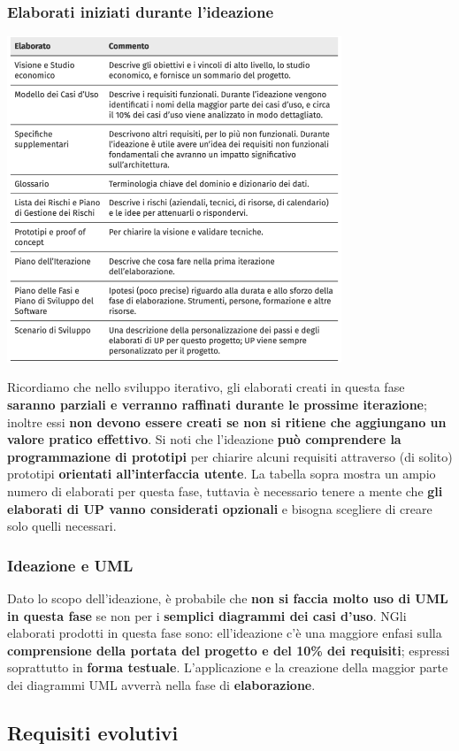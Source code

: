\documentclass[12pt]{article}
\begin{document}
\subsubsection{Elaborati iniziati durante l'ideazione}
\begin{center}
    \includegraphics[width = 0.75\textwidth]{Images/26.png}
\end{center}
Ricordiamo che nello sviluppo iterativo, gli elaborati creati in questa fase \textbf{saranno parziali e verranno raffinati durante le prossime iterazione}; inoltre essi \textbf{non devono essere creati se non si ritiene che aggiungano un valore pratico effettivo}.
Si noti che l'ideazione \textbf{può comprendere la programmazione di prototipi} per chiarire alcuni requisiti attraverso (di solito) prototipi \textbf{orientati all'interfaccia utente}.
La tabella sopra mostra un ampio numero di elaborati per questa fase, tuttavia è necessario tenere a mente che \textbf{gli elaborati di UP vanno considerati opzionali} e bisogna scegliere di creare solo quelli necessari.
\subsubsection{Ideazione e UML}
Dato lo scopo dell'ideazione, è probabile che \textbf{non si faccia molto uso di UML in questa fase} se non per i \textbf{semplici diagrammi dei casi d'uso}.
NGli elaborati prodotti in questa fase sono:
ell'ideazione c'è una maggiore enfasi sulla \textbf{comprensione della portata del progetto e del 10\% dei requisiti}; espressi soprattutto in \textbf{forma testuale}.
L'applicazione e la creazione della maggior parte dei diagrammi UML avverrà nella fase di \textbf{elaborazione}.
\subsection{Requisiti evolutivi}
\end{document}
